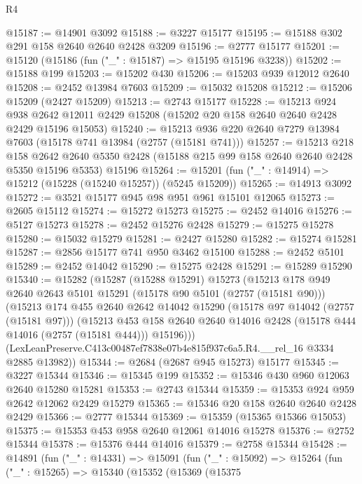 \begin{lexlean}{R4}
\begin{coremodule}
@15187 := @14901 @3092
@15188 := @3227 @15177
@15195 := @15188 @302 @291 @158 @2640 @2640 @2428 @3209
@15196 := @2777 @15177
@15201 := @15120 (@15186 (fun ("_" : @15187) => @15195 @15196 @3238))
@15202 := @15188 @199
@15203 := @15202 @430
@15206 := @15203 @939 @12012 @2640
@15208 := @2452 @13984 @7603
@15209 := @15032 @15208
@15212 := @15206 @15209 (@2427 @15209)
@15213 := @2743 @15177
@15228 := @15213
    @924
    @938
    @2642
    @12011
    @2429
    @15208
    (@15202 @20 @158 @2640 @2640 @2428 @2429 @15196 @15053)
@15240 := @15213 @936 @220 @2640 @7279 @13984 @7603 (@15178 @741 @13984 (@2757 (@15181 @741)))
@15257 := @15213
    @218
    @158
    @2642
    @2640
    @5350
    @2428
    (@15188 @215 @99 @158 @2640 @2640 @2428 @5350 @15196 @5353)
    @15196
@15264 := @15201 (fun ("_" : @14914) => @15212 (@15228 (@15240 @15257)) (@5245 @15209))
@15265 := @14913 @3092
@15272 := @3521 @15177 @945 @98 @951 @961 @15101 @12065
@15273 := @2605 @15112
@15274 := @15272 @15273
@15275 := @2452 @14016
@15276 := @5127 @15273
@15278 := @2452 @15276 @2428
@15279 := @15275 @15278
@15280 := @15032 @15279
@15281 := @2427 @15280
@15282 := @15274 @15281
@15287 := @2856 @15177 @741 @950 @3462 @15100
@15288 := @2452 @5101
@15289 := @2452 @14042
@15290 := @15275 @2428
@15291 := @15289 @15290
@15340 := @15282
    (@15287
      (@15288 @15291)
      @15273
      (@15213
        @178
        @949
        @2640
        @2643
        @5101
        @15291
        (@15178 @90 @5101 (@2757 (@15181 @90)))
        (@15213
          @174
          @455
          @2640
          @2642
          @14042
          @15290
          (@15178 @97 @14042 (@2757 (@15181 @97)))
          (@15213
            @453
            @158
            @2640
            @2640
            @14016
            @2428
            (@15178 @444 @14016 (@2757 (@15181 @444)))
            @15196)))
      (LexLeanPreserve.C413c00487ef7838e07b4e815f937c6a5.R4.__rel_16 @3334 @2885 @13982))
@15344 := @2684 (@2687 @945 @15273) @15177
@15345 := @3227 @15344
@15346 := @15345 @199
@15352 := @15346 @430 @960 @12063 @2640 @15280 @15281
@15353 := @2743 @15344
@15359 := @15353 @924 @959 @2642 @12062 @2429 @15279
@15365 := @15346 @20 @158 @2640 @2640 @2428 @2429
@15366 := @2777 @15344
@15369 := @15359 (@15365 @15366 @15053)
@15375 := @15353 @453 @958 @2640 @12061 @14016 @15278
@15376 := @2752 @15344
@15378 := @15376 @444 @14016
@15379 := @2758 @15344
@15428 := @14891
    (fun ("_" : @14331) =>
    @15091
      (fun ("_" : @15092) =>
      @15264
        (fun ("_" : @15265) =>
        @15340
          (@15352
            (@15369
              (@15375

\end{coremodule}
\end{lexlean}
